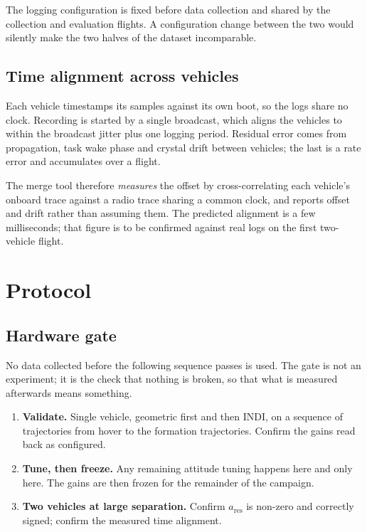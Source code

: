 The logging configuration is fixed before data collection and shared by the collection and
evaluation flights. A configuration change between the two would silently make the two halves of
the dataset incomparable.

\subsection{Time alignment across vehicles}

Each vehicle timestamps its samples against its own boot, so the logs share no clock. Recording is
started by a single broadcast, which aligns the vehicles to within the broadcast jitter plus one
logging period. Residual error comes from propagation, task wake phase and crystal drift between
vehicles; the last is a rate error and accumulates over a flight.

The merge tool therefore \emph{measures} the offset by cross-correlating each vehicle's onboard
trace against a radio trace sharing a common clock, and reports offset and drift rather than
assuming them. The predicted alignment is a few milliseconds; that figure is to be confirmed
against real logs on the first two-vehicle flight.

\section{Protocol}
\label{sec:setup-protocol}

\subsection{Hardware gate}
\label{sec:setup-gate}

No data collected before the following sequence passes is used. The gate is not an experiment; it
is the check that nothing is broken, so that what is measured afterwards means something.

\begin{enumerate}
  \item \textbf{Validate.} Single vehicle, geometric first and then INDI, on a sequence of trajectories from hover to the
        formation trajectories.
        Confirm the gains read back as configured.
  \item \textbf{Tune, then freeze.} Any remaining attitude tuning happens here and only here. The
        gains are then frozen for the remainder of the campaign.
  \item \textbf{Two vehicles at large separation.} Confirm $a_{\mathrm{res}}$ is non-zero and
        correctly signed; confirm the measured time alignment.
\end{enumerate}

